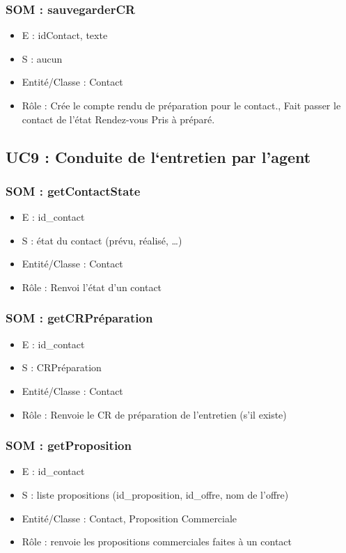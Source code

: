 \subsubsection{SOM : sauvegarderCR}
	\begin{itemize}
		\item E : idContact, texte
		\item S : aucun
		\item Entité/Classe : Contact
		\item Rôle : Crée le compte rendu de préparation pour le contact., Fait passer le contact
	de l’état Rendez-vous Pris à préparé.
	\end{itemize}



\subsection{UC9 : Conduite de l‘entretien par l’agent}
\subsubsection{SOM : getContactState}
	\begin{itemize}
		\item E : id\_contact
		\item S : état du contact (prévu, réalisé, …)
		\item Entité/Classe : Contact
		\item Rôle : Renvoi l’état d’un contact
	\end{itemize}

\subsubsection{SOM : getCRPréparation}
	\begin{itemize}
		\item E : id\_contact
		\item S : CRPréparation
		\item Entité/Classe : Contact
		\item Rôle : Renvoie le CR de préparation de l’entretien (s’il existe)
	\end{itemize}

\subsubsection{SOM : getProposition}
	\begin{itemize}
		\item E : id\_contact
		\item S : liste propositions (id\_proposition, id\_offre, nom de l’offre)
		\item Entité/Classe : Contact, Proposition Commerciale
		\item Rôle : renvoie les propositions commerciales faites à un contact
	\end{itemize}

